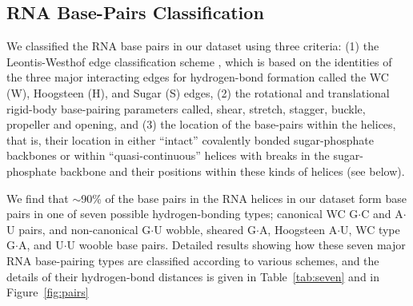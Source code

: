\subsection{RNA Base-Pairs Classification}
We classified the RNA base  pairs in our dataset using three criteria:
(1) the Leontis-Westhof edge classification scheme \cite{leontis1998},
which is based on the  identities of the three major interacting edges
for  hydrogen-bond formation  called the  WC (W),  Hoogsteen  (H), and
Sugar  (S)  edges, (2)  the  rotational  and translational  rigid-body
base-pairing  parameters  called,  shear,  stretch,  stagger,  buckle,
propeller and opening,  and (3) the location of  the base-pairs within
the helices,  that is, their location in  either ``intact'' covalently
bonded   sugar-phosphate  backbones  or   within  ``quasi-continuous''
helices  with  breaks  in   the  sugar-phosphate  backbone  and  their
positions within these kinds of helices (see below).

We find  that $\sim$90\% of the base  pairs in the RNA  helices in our
dataset  form base  pairs in  one of  seven  possible hydrogen-bonding
types; canonical  WC G$\cdot$C and A$\cdot$U  pairs, and non-canonical
G$\cdot$U  wobble,  sheared G$\cdot$A,  Hoogsteen  A$\cdot$U, WC  type
G$\cdot$A, and  U$\cdot$U wooble base pairs.  Detailed results showing
how these seven major  RNA base-pairing types are classified according
to various  schemes, and the details of  their hydrogen-bond distances
is given in Table~\ref{tab:seven} and in Figure~\ref{fig:pairs}

